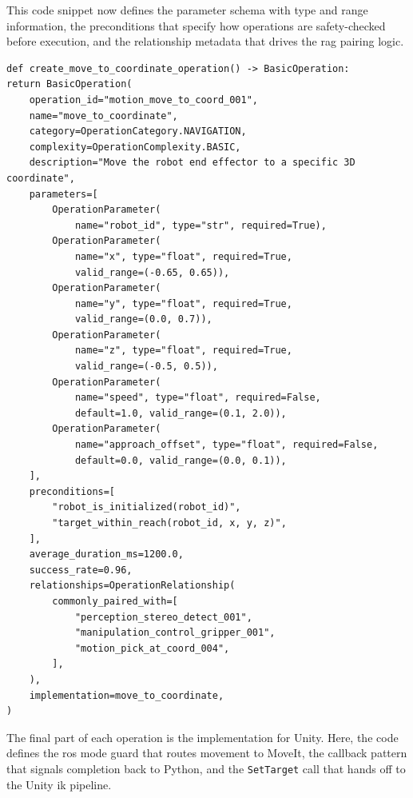 \documentclass[
     12pt,
     a4paper,
     BCOR=10mm,
     DIV=14,
     listof=totoc,
     bibliography=totoc,
     parskip,
     twoside,
     headsepline
     ]{scrreprt}
\begin{document}
This code snippet now defines the parameter schema with type and range information, the preconditions that specify how operations are safety-checked before execution, and the relationship metadata that drives the \gls{rag} pairing logic.

\begin{lstlisting}[caption={Metadata registry definition detailing type schemas, preconditions, and operational relationships for RAG lookup.}, extendedchars=true]
def create_move_to_coordinate_operation() -> BasicOperation:
return BasicOperation(
    operation_id="motion_move_to_coord_001",
    name="move_to_coordinate",
    category=OperationCategory.NAVIGATION,
    complexity=OperationComplexity.BASIC,
    description="Move the robot end effector to a specific 3D coordinate",
    parameters=[
        OperationParameter(
            name="robot_id", type="str", required=True),
        OperationParameter(
            name="x", type="float", required=True,
            valid_range=(-0.65, 0.65)),
        OperationParameter(
            name="y", type="float", required=True,
            valid_range=(0.0, 0.7)),
        OperationParameter(
            name="z", type="float", required=True,
            valid_range=(-0.5, 0.5)),
        OperationParameter(
            name="speed", type="float", required=False,
            default=1.0, valid_range=(0.1, 2.0)),
        OperationParameter(
            name="approach_offset", type="float", required=False,
            default=0.0, valid_range=(0.0, 0.1)),
    ],
    preconditions=[
        "robot_is_initialized(robot_id)",
        "target_within_reach(robot_id, x, y, z)",
    ],
    average_duration_ms=1200.0,
    success_rate=0.96,
    relationships=OperationRelationship(
        commonly_paired_with=[
            "perception_stereo_detect_001",
            "manipulation_control_gripper_001",
            "motion_pick_at_coord_004",
        ],
    ),
    implementation=move_to_coordinate,
)
\end{lstlisting}

The final part of each operation is the implementation for Unity. Here, the code defines the \gls{ros} mode guard that routes movement to MoveIt, the callback pattern that signals completion back to Python, and the \texttt{SetTarget} call that hands off to the Unity \gls{ik} pipeline.
\end{document}
